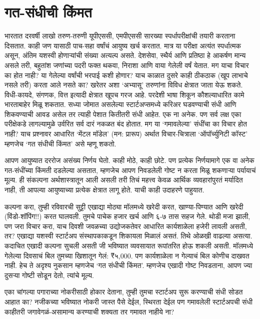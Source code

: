\chapter{गत-संधीची किंमत}

भारतात दरवर्षी लाखो तरुण-तरुणी यूपीएससी, एमपीएससी सारख्या स्पर्धापरीक्षांची तयारी करताना दिसतात. काही जण यासाठी पाच-सहा वर्षांचं आयुष्य खर्च करतात. मात्र या परीक्षा अत्यंत स्पर्धात्मक असून, अंतिम यशस्वी होणाऱ्यांची संख्या अत्यल्प असते. देशसेवा, स्थैर्य आणि प्रतिष्ठा हे आकर्षण मान्य असले तरी, बहुतांश जणांच्या पदरी फक्त थकवा, निराशा आणि वाया गेलेली वर्षं येतात. मग याचा विचार का होत नाही? या गेलेल्या वर्षांची भरपाई कशी होणार? याच काळात दुसरे काही ठीकठाक (खूप लाभाचे नसले तरी) करता आले नसते का? खरेतर अशा ‘अभ्यासू’ तरुणांना विविध क्षेत्रात जाता येऊ शकते. विधी-कायदे, संगणक, वित्त इत्यादी क्षेत्रात खूपच गरज आहे. परदेशी भाषा शिकून कौशल्याधारित कामे भारताबाहेर मिळू शकतात.  सध्या जोमात असलेल्या स्टार्टअप्समध्ये करिअर घडवण्याची संधी आणि शिकवण्याची आवड असेल तर त्याही पेशात कितीतरी संधी आहेत.  एक ना अनेक. पण सर्व लक्ष एका परीक्षेकडे लागल्यामुळे उर्वरित सर्व दारं नकळत बंद होतात. मग या ‘गमावलेल्या’ संधींचा का विचार होत नाही? याच प्रश्नावर आधारित ‘मेंटल मॉडेल’ (मन: प्रारूप) अर्थात विचार-चित्राला ‘ऑपॉर्च्युनिटी कॉस्ट’ म्हणजेच ‘गत संधीची किंमत’ असे म्हणू शकतो. 

आपण आयुष्यात दररोज असंख्य निर्णय घेतो. काही मोठे, काही छोटे. पण प्रत्येक निर्णयामागे एक वा अनेक गत-संधींच्या किंमती दडलेल्या असतात, म्हणजेच आपण निवडलेली गोष्ट न करता मिळू शकणाऱ्या पर्यायाचं मूल्य. ही संकल्पना अर्थशास्त्रातून आली असली तरी तिचं महत्त्व केवळ आर्थिक व्यवहारांपुरतं मर्यादित नाही, ती आपल्या आयुष्याच्या प्रत्येक क्षेत्रात लागू होते. याची काही उदाहरणे पाहुयात.

कल्पना करा, तुम्ही रविवारची सुट्टी एखाद्या मोठ्या मॉलमध्ये खरेदी करत, खाण्या-पिण्यात आणि खरेदी (विंडो-शॉपिंग!!) करत घालवली. तुमचे पाचेक हजार खर्च आणि ६-७ तास सहज गेले. थोडी मजा झाली, पण जरा विचार करा, याच दिवशी जवळच्या उद्योजकतेवर आधारित कार्यशाळेला हजेरी लावली असती, तर? एखाद्या यशस्वी स्टार्टअप संस्थापकाकडून शिकायला मिळालं असतं. तिथे ओळखी वाढल्या असत्या. कदाचित एखादी कल्पना सुचली असती जी भविष्यात व्यवसायात रूपांतरित होऊ शकली असती. मॉलमध्ये गेलेल्या दिवसाचं बिल तुमच्या खिशातून गेलं: ₹५,000. पण कार्यशाळेला न गेल्याचं बिल कोणीच दाखवत नाही. हेच ते अदृश्य नुकसान म्हणजेच ‘गत संधीची किंमत’. म्हणजेच  एखादी गोष्ट निवडताना, आपण ज्या दुसऱ्या गोष्टी सोडून देतो, त्यांचे मूल्य.

एका चांगल्या पगाराच्या नोकरीसाठी होकार देताना, तुम्ही तुमचा स्टार्टअप सुरू करण्याची संधी सोडत आहात का? नजीकच्या भविष्यात नोकरी जास्त पैसे देईल, स्थिरता देईल पण गमावलेली स्टार्टअपची संधी काहीतरी जगावेगळं-असामान्य करण्याची शक्यता तर गमावत नाहीये ना?

